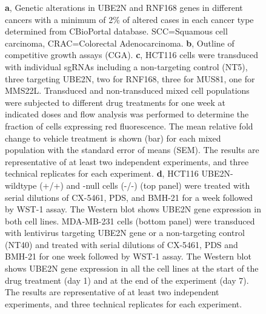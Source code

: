 \addtocounter{figure}{-1}
\begin{figure}
  \caption{
        \newline
        \textbf{a}, Genetic alterations in UBE2N and RNF168 genes in different cancers with a minimum of 2\% of altered cases in each cancer type determined from CBioPortal database. SCC=Squamous cell carcinoma, CRAC=Colorectal Adenocarcinoma.
        \newline
        \textbf{b}, Outline of competitive growth assays (CGA).
        \newline
        \textbf{c}, HCT116 cells were transduced with individual sgRNAs including a non-targeting control (NT5), three targeting UBE2N, two for RNF168, three for MUS81, one for MMS22L. Transduced and non-transduced mixed cell populations were subjected to different drug treatments for one week at indicated doses and flow analysis was performed to determine the fraction of cells expressing red fluorescence. The mean relative fold change to vehicle treatment is shown (bar) for each mixed population with the standard error of means (SEM). The results are representative of at least two independent experiments, and three technical replicates for each experiment.
        \newline
        \textbf{d}, HCT116 UBE2N-wildtype (+/+) and -null cells (-/-) (top panel) were treated with serial dilutions of CX-5461, PDS, and BMH-21 for a week followed by WST-1 assay. The Western blot shows UBE2N gene expression in both cell lines. MDA-MB-231 cells (bottom panel) were transduced with lentivirus targeting UBE2N gene or a non-targeting control (NT40) and treated with serial dilutions of CX-5461, PDS and BMH-21 for one week followed by WST-1 assay. The Western blot shows UBE2N gene expression in all the cell lines at the start of the drug treatment (day 1) and at the end of the experiment (day 7). The results are representative of at least two independent experiments, and three technical replicates for each experiment.
        }
\end{figure}
\clearpage

